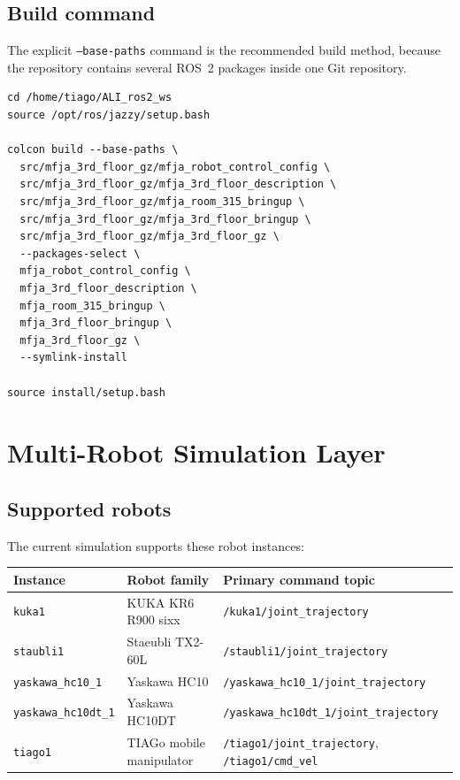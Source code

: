 \documentclass[12pt,a4paper]{report}
\newcommand{\codenext}[1]{\par\Needspace{#1\baselineskip}}
\begin{document}
\section{Build command}

The explicit \texttt{--base-paths} command is the recommended build method,
because the repository contains several ROS~2 packages inside one Git
repository.

\codenext{18}
\begin{lstlisting}[style=terminalcode,caption={Current meta-repository build command.}]
cd /home/tiago/ALI_ros2_ws
source /opt/ros/jazzy/setup.bash

colcon build --base-paths \
  src/mfja_3rd_floor_gz/mfja_robot_control_config \
  src/mfja_3rd_floor_gz/mfja_3rd_floor_description \
  src/mfja_3rd_floor_gz/mfja_room_315_bringup \
  src/mfja_3rd_floor_gz/mfja_3rd_floor_bringup \
  src/mfja_3rd_floor_gz/mfja_3rd_floor_gz \
  --packages-select \
  mfja_robot_control_config \
  mfja_3rd_floor_description \
  mfja_room_315_bringup \
  mfja_3rd_floor_bringup \
  mfja_3rd_floor_gz \
  --symlink-install

source install/setup.bash
\end{lstlisting}

\chapter{Multi-Robot Simulation Layer}

\section{Supported robots}

The current simulation supports these robot instances:

\begingroup
\small
\begin{longtable}{@{}p{}p{}p{}@{}}
\toprule
Instance & Robot family & Primary command topic \\
\midrule
\endhead
\texttt{kuka1} & KUKA KR6 R900 sixx & \texttt{/kuka1/joint\_trajectory} \\
\texttt{staubli1} & Staeubli TX2-60L & \texttt{/staubli1/joint\_trajectory} \\
\texttt{yaskawa\_hc10\_1} & Yaskawa HC10 & \texttt{/yaskawa\_hc10\_1/joint\_trajectory} \\
\texttt{yaskawa\_hc10dt\_1} & Yaskawa HC10DT & \texttt{/yaskawa\_hc10dt\_1/joint\_trajectory} \\
\texttt{tiago1} & TIAGo mobile manipulator & \texttt{/tiago1/joint\_trajectory}, \texttt{/tiago1/cmd\_vel} \\
\bottomrule
\end{longtable}
\endgroup
\end{document}

